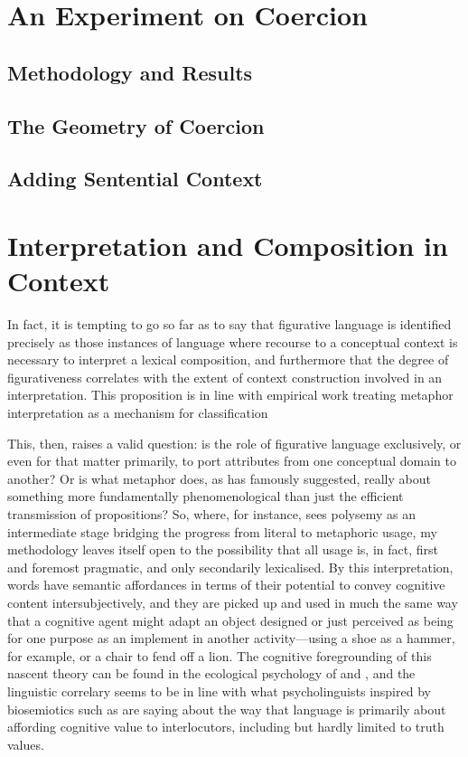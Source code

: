 \section{An Experiment on Coercion}

\subsection{Methodology and Results}

\subsection{The Geometry of Coercion}

\subsection{Adding Sentential Context}

\section{Interpretation and Composition in Context}

In fact, it is tempting to go so far as to say that figurative language is identified precisely as those instances of language where recourse to a conceptual context is necessary to interpret a lexical composition, and furthermore that the degree of figurativeness correlates with the extent of context construction involved in an interpretation.  This proposition is in line with  empirical work treating metaphor interpretation as a mechanism for classification

This, then, raises a valid question: is the role of figurative language exclusively, or even for that matter primarily, to port attributes from one conceptual domain to another?  Or is what metaphor does, as \cite{Davidson} has famously suggested, really about something more fundamentally phenomenological than just the efficient transmission of propositions?  So, where, for instance, \cite{Sweetser} sees polysemy as an intermediate stage bridging the progress from literal to metaphoric usage, my methodology leaves itself open to the possibility that all usage is, in fact, first and foremost pragmatic, and only secondarily lexicalised.  By this interpretation, words have semantic affordances in terms of their potential to convey cognitive content intersubjectively, and they are picked up and used in much the same way that a cognitive agent might adapt an object designed or just perceived as being for one purpose as an implement in another activity---using a shoe as a hammer, for example, or a chair to fend off a lion.  The cognitive foregrounding of this nascent theory can be found in the ecological psychology of \cite{Gibson} and \cite{Bateson}, and the linguistic correlary seems to be in line with what psycholinguists inspired by biosemiotics such as \cite{Raczsek} are saying about the way that language is primarily about affording cognitive value to interlocutors, including but hardly limited to truth values.

